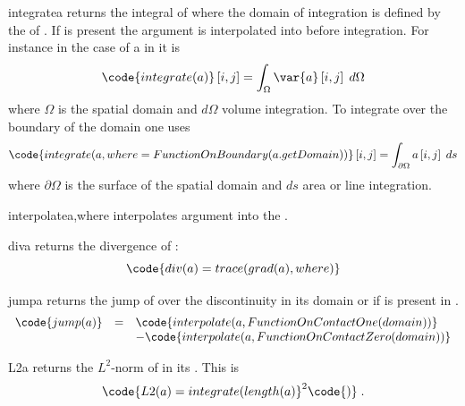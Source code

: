 \begin{funcdesc}{integrate}{a}
returns the integral of  where the domain of integration is defined by
the \FunctionSpace of . If  is present the argument is
interpolated into \FunctionSpace {} before integration.
For instance in the case of a \RankTwo in \ContinuousFunction it is
\begin{equation}
\code{integrate(a)}\left[i,j\right]=\int_{\Omega}\var{a} \left[i,j\right] \; d\Omega
\end{equation}
where $\Omega$ is the spatial domain and $d\Omega$ volume integration.
To integrate over the boundary of the domain one uses
\begin{equation}
\code{integrate(a,where=FunctionOnBoundary(a.getDomain))}\left[i,j\right]=\int_{\partial \Omega} a\left[i,j\right] \; ds
\end{equation}
where $\partial \Omega$ is the surface of the spatial domain and $ds$ area or
line integration.
\end{funcdesc}

\begin{funcdesc}{interpolate}{a,where}
interpolates argument  into the \FunctionSpace {}.
\end{funcdesc}

\begin{funcdesc}{div}{a}
returns the divergence of :
\begin{equation}
    \code{div(a)=trace(grad(a),where)}
\end{equation}
\end{funcdesc}

\begin{funcdesc}{jump}{a}
returns the jump of  over the discontinuity in its domain or if
\Domain {} is present in .
\begin{equation}
\begin{array}{rcl}
\code{jump(a)}& = &\code{interpolate(a,FunctionOnContactOne(domain))} \\
              &   & \hfill - \code{interpolate(a,FunctionOnContactZero(domain))}
\end{array}
\end{equation}
\end{funcdesc}

\begin{funcdesc}{L2}{a}
returns the $L^2$-norm of  in its \FunctionSpace. This is
\begin{equation}
\code{L2(a)=integrate(length(a)}^2\code{)} \; .
\end{equation}
\end{funcdesc}

